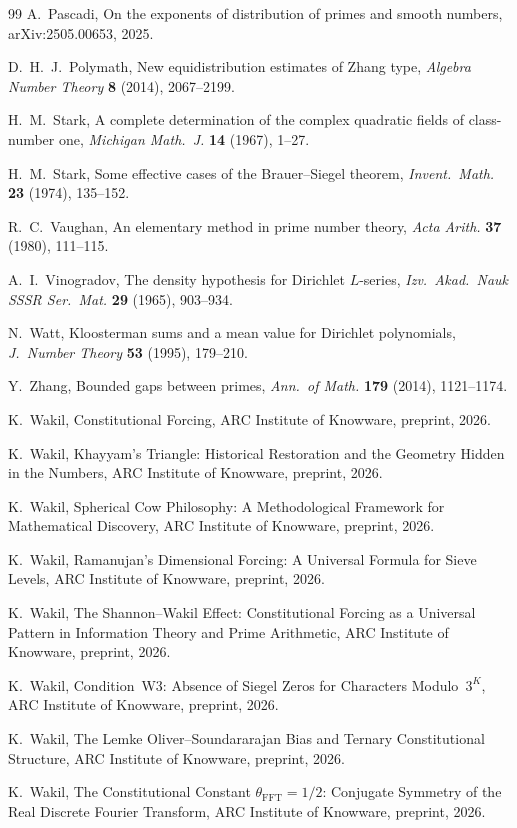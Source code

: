 \documentclass[12pt]{amsart}
\theoremstyle{plain}
\theoremstyle{definition}
\begin{document}
\begin{thebibliography}{99}
A.~Pascadi,
On the exponents of distribution of primes and smooth numbers,
arXiv:2505.00653, 2025.

D.~H.~J.~Polymath,
New equidistribution estimates of Zhang type,
\emph{Algebra Number Theory} \textbf{8} (2014), 2067--2199.

H.~M.~Stark,
A complete determination of the complex quadratic fields of
class-number one,
\emph{Michigan Math.\ J.} \textbf{14} (1967), 1--27.

H.~M.~Stark,
Some effective cases of the Brauer--Siegel theorem,
\emph{Invent.\ Math.} \textbf{23} (1974), 135--152.

R.~C.~Vaughan,
An elementary method in prime number theory,
\emph{Acta Arith.} \textbf{37} (1980), 111--115.

A.~I.~Vinogradov,
The density hypothesis for Dirichlet $L$-series,
\emph{Izv.\ Akad.\ Nauk SSSR Ser.\ Mat.} \textbf{29} (1965), 903--934.

N.~Watt,
Kloosterman sums and a mean value for Dirichlet polynomials,
\emph{J.\ Number Theory} \textbf{53} (1995), 179--210.

Y.~Zhang,
Bounded gaps between primes,
\emph{Ann.\ of Math.} \textbf{179} (2014), 1121--1174.


K.~Wakil,
Constitutional Forcing,
ARC Institute of Knowware, preprint, 2026.

K.~Wakil,
Khayyam's Triangle: Historical Restoration and the Geometry Hidden in the
Numbers,
ARC Institute of Knowware, preprint, 2026.

K.~Wakil,
Spherical Cow Philosophy: A Methodological Framework for Mathematical
Discovery,
ARC Institute of Knowware, preprint, 2026.

K.~Wakil,
Ramanujan's Dimensional Forcing: A Universal Formula for Sieve Levels,
ARC Institute of Knowware, preprint, 2026.

K.~Wakil,
The Shannon--Wakil Effect: Constitutional Forcing as a Universal Pattern
in Information Theory and Prime Arithmetic,
ARC Institute of Knowware, preprint, 2026.

K.~Wakil,
Condition~W3: Absence of Siegel Zeros for Characters Modulo~$3^K$,
ARC Institute of Knowware, preprint, 2026.

K.~Wakil,
The Lemke Oliver--Soundararajan Bias and Ternary Constitutional Structure,
ARC Institute of Knowware, preprint, 2026.

K.~Wakil,
The Constitutional Constant $\theta_{\mathrm{FFT}} = 1/2$: Conjugate Symmetry
of the Real Discrete Fourier Transform,
ARC Institute of Knowware, preprint, 2026.

\end{thebibliography}
\end{document}
